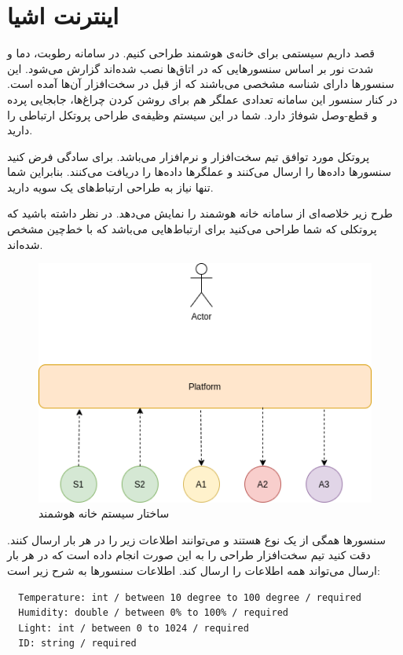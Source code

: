\documentclass[../main.tex]{subfiles}
\begin{document}
\section{اینترنت اشیا}

قصد داریم سیستمی برای خانه‌ی هوشمند طراحی کنیم.
در سامانه رطوبت، دما و شدت نور بر اساس سنسورهایی که در اتاق‌ها نصب شده‌اند گزارش می‌شود.
این سنسورها دارای شناسه مشخصی می‌باشند که از قبل در سخت‌افزار آن‌ها آمده است.
در کنار سنسور این سامانه تعدادی عملگر هم برای روشن کردن چراغ‌ها، جابجایی پرده و قطع-وصل شوفاژ دارد.
شما در این سیستم وظیفه‌ی طراحی پروتکل ارتباطی را دارید.

پروتکل مورد توافق تیم سخت‌افزار و نرم‌افزار  می‌باشد. برای سادگی فرض کنید سنسورها داده‌ها را ارسال می‌کنند و عملگرها داده‌ها را دریافت می‌کنند.
بنابراین شما تنها نیاز به طراحی ارتباط‌های یک سویه دارید.

طرح زیر خلاصه‌ای از سامانه خانه هوشمند را نمایش می‌دهد. در نظر داشته باشید که پروتکلی که
شما طراحی می‌کنید برای ارتباط‌هایی می‌باشد که با خط‌چین مشخص شده‌اند.

\begin{figure}[h!]
  \centering
  \includegraphics[scale=0.2]{json.png}
  \caption{ساختار سیستم خانه هوشمند}
\end{figure}

سنسورها همگی از یک نوع هستند و می‌توانند اطلاعات زیر را در هر بار ارسال کنند.
دقت کنید تیم سخت‌افزار طراحی را به این صورت انجام داده است که در هر بار ارسال می‌تواند همه اطلاعات را ارسال کند.
اطلاعات سنسورها به شرح زیر است:

\begin{latin}
\begin{lstlisting}
  Temperature: int / between 10 degree to 100 degree / required
  Humidity: double / between 0% to 100% / required
  Light: int / between 0 to 1024 / required
  ID: string / required
\end{lstlisting}
\end{latin}
\end{document}
